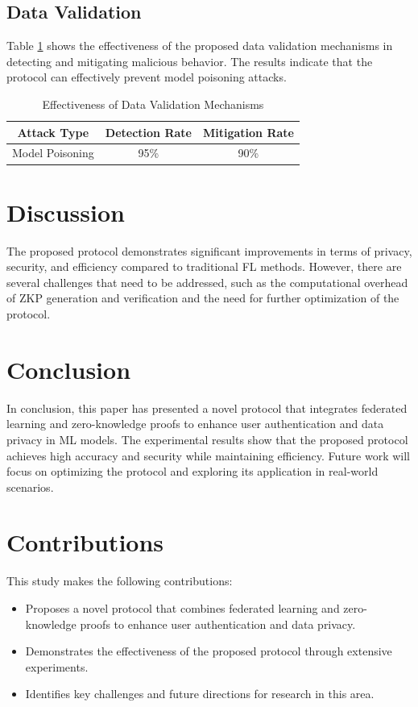 \documentclass{article}
\begin{document}
\subsection{Data Validation}

Table \ref{tab:data_validation} shows the effectiveness of the proposed data validation mechanisms in detecting and mitigating malicious behavior. The results indicate that the protocol can effectively prevent model poisoning attacks.

\begin{table}[ht]
\centering
\caption{Effectiveness of Data Validation Mechanisms}
\label{tab:data_validation}
\begin{tabular}{|c|c|c|}
\hline
Attack Type & Detection Rate & Mitigation Rate \\
\hline
Model Poisoning & 95\% & 90\% \\
\hline
\end{tabular}
\end{table}

\section{Discussion}
\label{sec:discussion}

The proposed protocol demonstrates significant improvements in terms of privacy, security, and efficiency compared to traditional FL methods. However, there are several challenges that need to be addressed, such as the computational overhead of ZKP generation and verification and the need for further optimization of the protocol.

\section{Conclusion}
\label{sec:conclusion}

In conclusion, this paper has presented a novel protocol that integrates federated learning and zero-knowledge proofs to enhance user authentication and data privacy in ML models. The experimental results show that the proposed protocol achieves high accuracy and security while maintaining efficiency. Future work will focus on optimizing the protocol and exploring its application in real-world scenarios.

\section{Contributions}
\label{sec:contributions}

This study makes the following contributions:
\begin{itemize}
    \item Proposes a novel protocol that combines federated learning and zero-knowledge proofs to enhance user authentication and data privacy.
    \item Demonstrates the effectiveness of the proposed protocol through extensive experiments.
    \item Identifies key challenges and future directions for research in this area.
\end{itemize}



\end{document}
